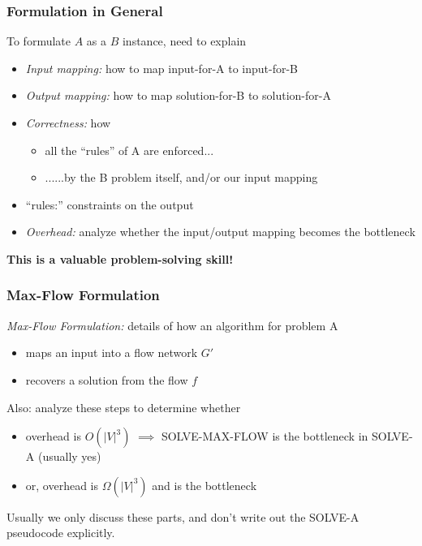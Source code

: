 \documentclass{beamer}
\begin{document}
\begin{frame} \frametitle{Formulation in General}
  To formulate $A$ as a $B$ instance, need to explain
  \begin{itemize}
  \item \emph{Input mapping:} how to map input-for-A to input-for-B
  \item \emph{Output mapping:} how to map solution-for-B to solution-for-A
  \item \emph{Correctness:} how
    \begin{itemize}
    \item all the ``rules'' of A are enforced...
    \item ......by the B problem itself, and/or our input mapping
    \end{itemize}
  \item ``rules:'' constraints on the output
  \item \emph{Overhead:} analyze whether the input/output mapping becomes the bottleneck
  \end{itemize}

  \vspace{.5cm}
  \textbf{This is a valuable problem-solving skill!}
\end{frame}

\begin{frame} \frametitle{Max-Flow Formulation}

\emph{Max-Flow Formulation:} details of how an algorithm for problem A
\begin{itemize}
  \item maps an input into a flow network $G'$
  \item recovers a solution from the flow $f$
\end{itemize}
\vspace{.5cm}
Also: analyze these steps to determine whether
\begin{itemize}
  \item overhead is $O(|V|^3)$ $\implies$ SOLVE-MAX-FLOW
    is the bottleneck in SOLVE-A (usually yes)
  \item or, overhead is $\Omega(|V|^3)$ and is the bottleneck
\end{itemize}
\vspace{.5cm}
Usually we only discuss these parts, and don't write out the SOLVE-A pseudocode
explicitly.
\end{frame}
\end{document}
